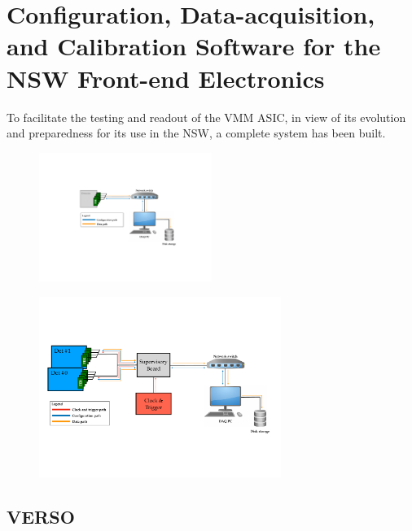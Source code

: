 \section{Configuration, Data-acquisition, and Calibration Software for the NSW Front-end Electronics}
\label{sec:nsw_vrs}

To facilitate the testing and readout of the VMM ASIC, in view
of its evolution and preparedness for its use in the NSW,
a complete system has been built.

\begin{figure}[!htb]
    \begin{center}
        \includegraphics[width=0.5\textwidth]{figures/nsw/vrs/vrs_diagram_minimalPDF}
        \caption{
        }
        \label{fig:vrs_diagram_minimal}
    \end{center}
\end{figure}

\begin{figure}[!htb]
    \begin{center}
        \includegraphics[width=0.7\textwidth]{figures/nsw/vrs/vrs_diagramPDF}
        \caption{
        }
        \label{fig:vrs_diagram}
    \end{center}
\end{figure}

\subsection{VERSO}
\label{sec:verso}

